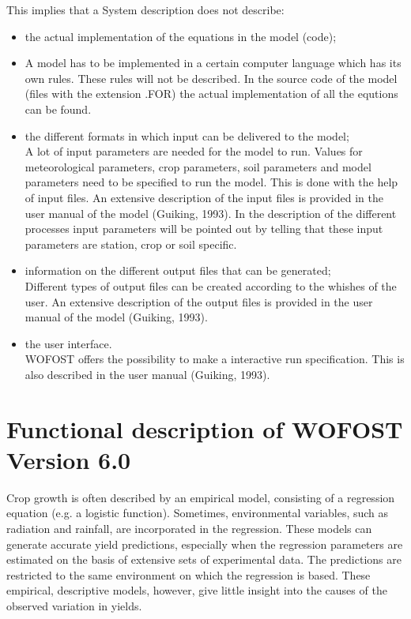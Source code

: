 This implies that a System description does not describe:
\begin{itemize}
\item the actual implementation of the equations in the model (code);
\item A model has to be implemented in a certain computer language which has its
own rules. These rules will not be described. In the source code of the model 
(files with the extension .FOR) the actual implementation of all the equtions
can be found.
\item the different formats in which input can be delivered to the model;\\
A lot of input parameters are needed for the model to run. Values for
meteorological parameters, crop parameters, soil parameters and model
parameters need to be specified to run the model. This is done with the help
of input files. An extensive description of the input files is provided in the user
manual of the model (Guiking, 1993). In the description of the different
processes input parameters will be pointed out by telling that these input
parameters are station, crop or soil specific.   
\item information on the different output files that can be generated;\\
Different types of output files can be created according to the whishes of the
user. An extensive description of the output files is provided in the user
manual of the model (Guiking, 1993).
\item the user interface. \\
WOFOST offers the possibility to make a interactive run specification. This is
also described in the user manual (Guiking, 1993).
\end{itemize}

\section{Functional description of WOFOST Version 6.0}

Crop growth is often described by an empirical model, consisting of a regression
equation (e.g. a logistic function). Sometimes, environmental variables, such as
radiation and rainfall, are incorporated in the regression. These models can generate
accurate yield predictions, especially when the regression parameters are estimated on
the basis of extensive sets of experimental data. The predictions are restricted to the
same environment on which the regression is based. These empirical, descriptive
models, however, give little insight into the causes of the observed variation in yields. 

